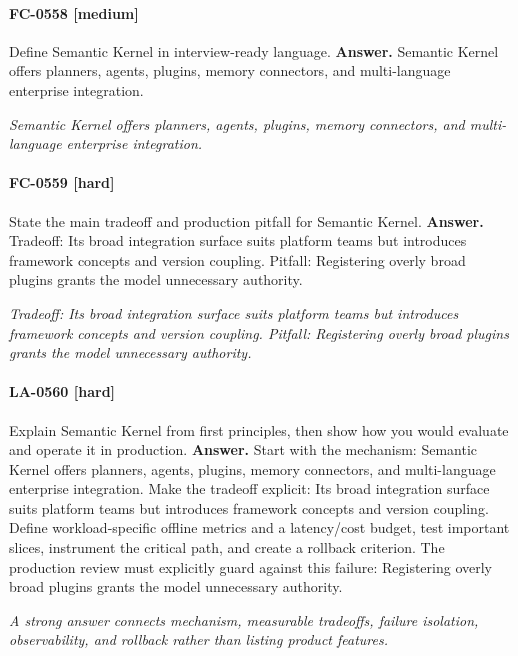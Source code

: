 \paragraph{FC-0558 [medium]} Define Semantic Kernel in interview-ready language.
\noindent\textbf{Answer.} Semantic Kernel offers planners, agents, plugins, memory connectors, and multi-language enterprise integration.
\par\textit{Semantic Kernel offers planners, agents, plugins, memory connectors, and multi-language enterprise integration.}
\paragraph{FC-0559 [hard]} State the main tradeoff and production pitfall for Semantic Kernel.
\noindent\textbf{Answer.} Tradeoff: Its broad integration surface suits platform teams but introduces framework concepts and version coupling. Pitfall: Registering overly broad plugins grants the model unnecessary authority.
\par\textit{Tradeoff: Its broad integration surface suits platform teams but introduces framework concepts and version coupling. Pitfall: Registering overly broad plugins grants the model unnecessary authority.}
\paragraph{LA-0560 [hard]} Explain Semantic Kernel from first principles, then show how you would evaluate and operate it in production.
\noindent\textbf{Answer.} Start with the mechanism: Semantic Kernel offers planners, agents, plugins, memory connectors, and multi-language enterprise integration. Make the tradeoff explicit: Its broad integration surface suits platform teams but introduces framework concepts and version coupling. Define workload-specific offline metrics and a latency/cost budget, test important slices, instrument the critical path, and create a rollback criterion. The production review must explicitly guard against this failure: Registering overly broad plugins grants the model unnecessary authority.
\par\textit{A strong answer connects mechanism, measurable tradeoffs, failure isolation, observability, and rollback rather than listing product features.}
